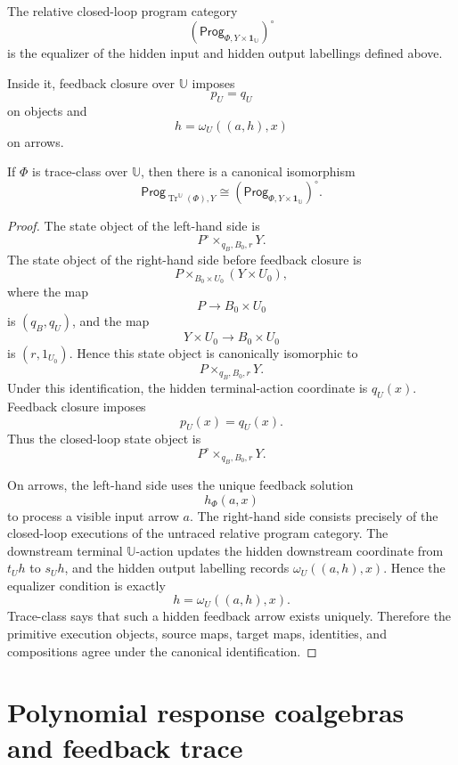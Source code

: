 \begin{definition}
\label{def:relative-closed-loop-program-category}
The relative closed-loop program category
\[
\left(
\mathsf{Prog}_{\Phi,Y\times\mathbf 1_{\mathbb U}}
\right)^\circ
\]
is the equalizer of the hidden input and hidden output labellings defined
above.
\end{definition}

Inside it, feedback closure over \(\mathbb U\) imposes
\[
p_U=q_U
\]
on objects and
\[
h=\omega_U((a,h),x)
\]
on arrows.

\begin{theorem}
\label{thm:relative-semantics-commutes-feedback}
If \(\Phi\) is trace-class over \(\mathbb U\), then there is a canonical
isomorphism
\[
\mathsf{Prog}_{\operatorname{Tr}^{\mathbb U}(\Phi),Y}
\cong
\left(
\mathsf{Prog}_{\Phi,Y\times\mathbf 1_{\mathbb U}}
\right)^\circ.
\]
\end{theorem}

\begin{proof}
The state object of the left-hand side is
\[
P^\circ\times_{q_B,B_0,r}Y.
\]
The state object of the right-hand side before feedback closure is
\[
P\times_{B_0\times U_0}(Y\times U_0),
\]
where the map
\[
P\to B_0\times U_0
\]
is \((q_B,q_U)\), and the map
\[
Y\times U_0\to B_0\times U_0
\]
is \((r,1_{U_0})\).  Hence this state object is canonically isomorphic to
\[
P\times_{q_B,B_0,r}Y.
\]
Under this identification, the hidden terminal-action coordinate is \(q_U(x)\).
Feedback closure imposes
\[
p_U(x)=q_U(x).
\]
Thus the closed-loop state object is
\[
P^\circ\times_{q_B,B_0,r}Y.
\]

On arrows, the left-hand side uses the unique feedback solution
\[
h_\Phi(a,x)
\]
to process a visible input arrow \(a\).  The right-hand side consists
precisely of the closed-loop executions of the untraced relative program
category.  The downstream terminal \(\mathbb U\)-action updates the hidden
downstream coordinate from \(t_Uh\) to \(s_Uh\), and the hidden output
labelling records \(\omega_U((a,h),x)\).  Hence the equalizer condition is
exactly
\[
h=\omega_U((a,h),x).
\]
Trace-class says that such a hidden feedback arrow exists uniquely.  Therefore
the primitive execution objects, source maps, target maps, identities, and
compositions agree under the canonical identification.
\end{proof}

\section{Polynomial response coalgebras and feedback trace}
\label{sec:polynomial-response-form-feedback}


